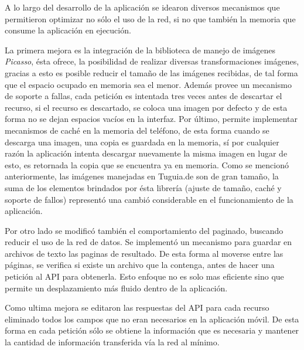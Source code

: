 A lo largo del desarrollo de la aplicación se idearon diversos mecanismos que permitieron optimizar no sólo el uso de la red, si no que también la memoria que consume la aplicación en ejecución.

La primera mejora es la integración de la biblioteca de manejo de imágenes \textit{Picasso}, ésta ofrece, la posibilidad de realizar diversas transformaciones imágenes, gracias a esto es posible reducir el tamaño de las imágenes recibidas, de tal forma que el espacio ocupado en memoria sea el menor. Además provee un mecanismo de soporte a fallas, cada petición es intentada tres veces antes de descartar el recurso, si el recurso es descartado, se coloca una imagen por defecto y de esta forma no se dejan espacios vacíos en la interfaz. Por último, permite implementar mecanismos de caché en la memoria del teléfono, de esta forma cuando se descarga una imagen, una copia es guardada en la memoria, sí por cualquier razón la aplicación intenta descargar nuevamente la misma imagen en lugar de esto, es retornada la copia que se encuentra ya en memoria. Como se mencionó anteriormente, las imágenes manejadas en Tuguia.de son de gran tamaño, la suma de los elementos brindados por ésta librería (ajuste de tamaño, caché y soporte de fallos) representó una cambió considerable en el funcionamiento de la aplicación. 

Por otro lado se modificó también el comportamiento del paginado, buscando reducir el uso de la red de datos. Se implementó un mecanismo para guardar en archivos de texto las paginas de resultado. De esta forma al moverse entre las páginas, se verifica si existe un archivo que la contenga, antes de hacer una petición al API para obtenerla. Esto enfoque no es solo mas eficiente sino que permite un desplazamiento más fluido dentro de la aplicación.

Como ultima mejora se editaron las respuestas del API para cada recurso eliminado todos los campos que no eran necesarios en la aplicación móvil. De esta forma en cada petición sólo se obtiene la información que es necesaria y mantener la cantidad de información transferida vía la red al mínimo.

